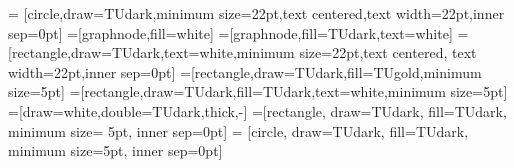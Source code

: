 \renewcommand{\a}{\boldsymbol{\mathsf{a}}}
\renewcommand{\b}{\boldsymbol{\mathsf{b}}}
\newcommand{\f}{\boldsymbol{\mathsf{f}}}
\newcommand{\h}{\boldsymbol{\mathsf{h}}}
\newcommand{\kvec}{\boldsymbol{\mathsf{k}}}
\newcommand{\m}{\boldsymbol{\mathsf{m}}}
\renewcommand{\u}{u}
\renewcommand{\v}{v}
\newcommand{\w}{w}
\newcommand{\x}{x}
\newcommand{\y}{y}
\newcommand{\z}{z}

\newcommand{\sA}{\boldsymbol{\mathsf{A}}}
\newcommand{\sB}{\boldsymbol{\mathsf{B}}}
\newcommand{\sC}{\boldsymbol{\mathsf{C}}}
\newcommand{\sF}{\boldsymbol{\mathsf{F}}}
\newcommand{\sG}{\boldsymbol{\mathsf{G}}}
\newcommand{\sH}{\boldsymbol{\mathsf{H}}}
\newcommand{\sI}{\boldsymbol{\mathsf{I}}}
\newcommand{\sK}{\boldsymbol{\mathsf{K}}}
\newcommand{\sL}{\boldsymbol{\mathsf{L}}}
\newcommand{\sM}{\boldsymbol{\mathsf{M}}}
\newcommand{\sR}{\boldsymbol{\mathsf{R}}}
\newcommand{\sS}{\boldsymbol{\mathsf{S}}}
\newcommand{\sU}{\boldsymbol{\mathsf{U}}}
\newcommand{\sV}{\boldsymbol{\mathsf{V}}}
\newcommand{\sW}{\boldsymbol{\mathsf{W}}}
\newcommand{\sX}{\boldsymbol{\mathsf{X}}}
\newcommand{\sY}{\boldsymbol{\mathsf{Y}}}
\newcommand{\sSigma}{\boldsymbol{\mathsf{\Sigma}}}
\newcommand{\sLambda}{\boldsymbol{\mathsf{\Lambda}}}
\newcommand{\sXi}{\boldsymbol{\mathsf{\Xi}}}

\newcommand{\X}{\vec{X}}
\newcommand{\bX}{\mathbb{X}}

\newcommand{\up}{\textasciicircum}


\newcommand*\circled[1]{\tikzexternaldisable\tikz[baseline=(char.base)]{
            \node[shape=circle,draw,inner sep=2pt] (char) {#1};}\tikzexternalenable}

\usetikzlibrary{arrows,shapes,plotmarks,decorations.pathmorphing,matrix}
\usetikzlibrary{backgrounds,calc,positioning,fadings}

\tikzset{>=stealth'} 
 = 
   [circle,draw=TUdark,minimum size=22pt,text centered,text
     width=22pt,inner sep=0pt] 
   =[graphnode,fill=white]
   =[graphnode,fill=TUdark,text=white]
   =[rectangle,draw=TUdark,text=white,minimum
size=22pt,text centered, text width=22pt,inner sep=0pt]
   =[rectangle,draw=TUdark,fill=TUgold,minimum size=5pt]
 =[rectangle,draw=TUdark,fill=TUdark,text=white,minimum size=5pt]
  =[draw=white,double=TUdark,thick,-]
 =[rectangle, draw=TUdark, fill=TUdark, minimum size=
5pt, inner sep=0pt]
 = [circle, draw=TUdark, fill=TUdark, minimum
size=5pt, inner sep=0pt]

